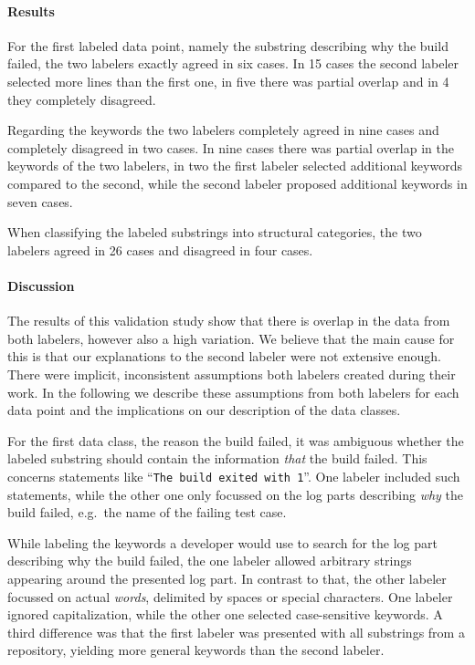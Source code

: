 \documentclass[\myrootdir/main.tex]{subfiles}
\begin{document}
\paragraph{Results}
For the first labeled data point, namely the substring describing why the build failed, the two labelers exactly agreed in six cases.
In 15 cases the second labeler selected more lines than the first one, in five there was partial overlap and in 4 they completely disagreed.

Regarding the keywords the two labelers completely agreed in nine cases and completely disagreed in two cases.
In nine cases there was partial overlap in the keywords of the two labelers, in two the first labeler selected additional keywords compared to the second, while the second labeler proposed additional keywords in seven cases.

When classifying the labeled substrings into structural categories, the two labelers agreed in 26 cases and disagreed in four cases.

\paragraph{Discussion}
The results of this validation study show that there is overlap in the data from both labelers, however also a high variation.
We believe that the main cause for this is that our explanations to the second labeler were not extensive enough.
There were implicit, inconsistent assumptions both labelers created during their work.
In the following we describe these assumptions from both labelers for each data point and the implications on our description of the data classes.

For the first data class, the reason the build failed, it was ambiguous whether the labeled substring should contain the information \emph{that} the build failed.
This concerns statements like ``\texttt{The build exited with 1}''.
One labeler included such statements, while the other one only focussed on the log parts describing \emph{why} the build failed, e.g.\ the name of the failing test case.

While labeling the keywords a developer would use to search for the log part describing why the build failed, the one labeler allowed arbitrary strings appearing around the presented log part.
In contrast to that, the other labeler focussed on actual \emph{words}, delimited by spaces or special characters.
One labeler ignored capitalization, while the other one selected case-sensitive keywords.
A third difference was that the first labeler was presented with all substrings from a repository, yielding more general keywords than the second labeler.
\end{document}
